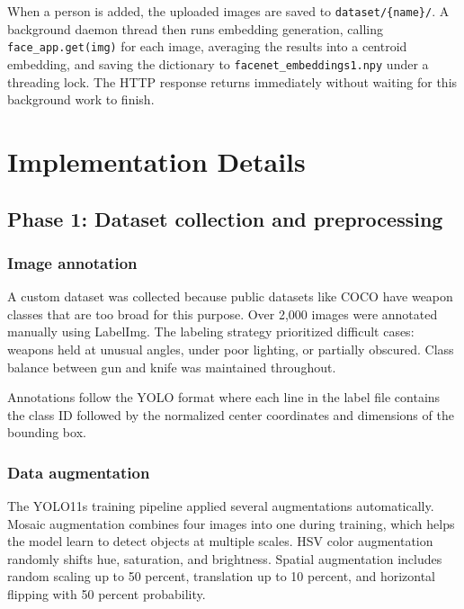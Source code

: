 \documentclass[12pt,a4paper]{report}
\begin{document}
When a person is added, the uploaded images are saved to \texttt{dataset/\{name\}/}. A background daemon thread then runs embedding generation, calling \texttt{face\_app.get(img)} for each image, averaging the results into a centroid embedding, and saving the dictionary to \texttt{facenet\_embeddings1.npy} under a threading lock. The HTTP response returns immediately without waiting for this background work to finish.


\chapter{Implementation Details}

\section{Phase 1: Dataset collection and preprocessing}

\subsection{Image annotation}

A custom dataset was collected because public datasets like COCO have weapon classes that are too broad for this purpose. Over 2,000 images were annotated manually using LabelImg. The labeling strategy prioritized difficult cases: weapons held at unusual angles, under poor lighting, or partially obscured. Class balance between gun and knife was maintained throughout.

Annotations follow the YOLO format where each line in the label file contains the class ID followed by the normalized center coordinates and dimensions of the bounding box.

\subsection{Data augmentation}

The YOLO11s training pipeline applied several augmentations automatically. Mosaic augmentation combines four images into one during training, which helps the model learn to detect objects at multiple scales. HSV color augmentation randomly shifts hue, saturation, and brightness. Spatial augmentation includes random scaling up to 50 percent, translation up to 10 percent, and horizontal flipping with 50 percent probability.
\end{document}
